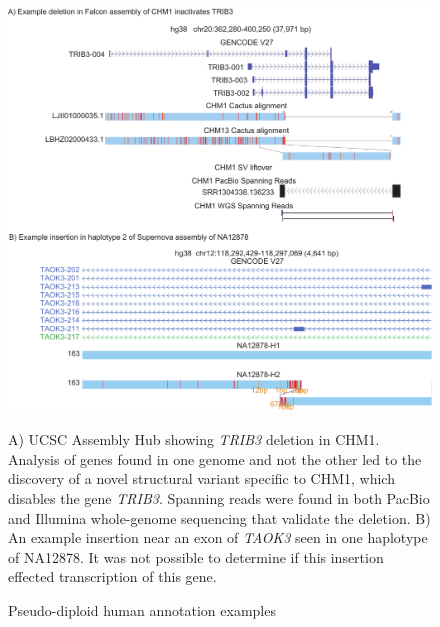 \begin{figure}
\centering
\includegraphics[width=\textwidth,height=0.75\textheight,keepaspectratio]{Figure_4.pdf}
\caption{Pseudo-diploid human annotation examples}
A) UCSC Assembly Hub \citep{nguyen2014comparative} showing \textit{TRIB3} deletion in CHM1. Analysis of genes found in one genome and not the other led to the discovery of a novel structural variant specific to CHM1, which disables the gene \textit{TRIB3}. Spanning reads were found in both PacBio and Illumina whole-genome sequencing that validate the deletion. B) An example insertion near an exon of \textit{TAOK3} seen in one haplotype of NA12878. It was not possible to determine if this insertion effected transcription of this gene.
\label{fig:human_example}
\end{figure}


